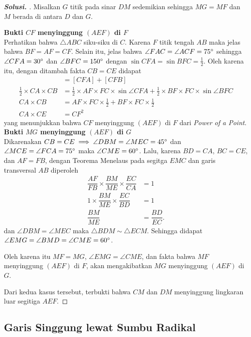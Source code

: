 \documentclass[letterpaper, 13pt]{scrartcl}
\begin{document}
\begin{proof}[\textbf{Solusi. }]
    Misalkan $G$ titik pada sinar $DM$ sedemikian sehingga $MG = MF$ dan $M$ berada di antara $D$ dan $G$.

\textbf{Bukti $CF$ menyinggung $(AEF)$ di $F$}\\
Perhatikan bahwa $\triangle ABC$ siku-siku di $C$. Karena $F$ titik tengah $AB$ maka jelas bahwa $BF=AF=CF$. Selain itu, jelas bahwa $\angle FAC = \angle ACF = 75^\circ$ sehingga $\angle CFA = 30^\circ$ dan $\angle BFC = 150^\circ$ dengan $\sin CFA = \sin BFC = \frac{1}{2}$. Oleh karena itu, dengan ditambah fakta $CB = CE$ didapat
\begin{align*}
    [ABC] &= [CFA] + [CFB]\\
    \frac{1}{2} \times CA \times CB &= \frac{1}{2} \times AF \times FC \times \sin \angle CFA + \frac{1}{2} \times BF \times FC \times \sin \angle BFC\\
     CA \times CB &= AF \times FC \times \frac{1}{2} + BF \times FC \times \frac{1}{2} \\
     CA \times CE &= CF^2
\end{align*}
yang menunjukkan bahwa $CF$ menyinggung $(AEF)$ di $F$ dari \textit{Power of a Point}.\\
\newline
\textbf{Bukti $MG$ menyinggung $(AEF)$ di $G$}\\
Dikarenakan $CB = CE \implies \angle DBM = \angle MEC = 45^\circ$ dan $\angle MCE = \angle FCA = 75^\circ$ maka $\angle CME = 60^\circ$.
Lalu, karena $BD = CA$, $BC = CE$, dan $AF=FB$, dengan Teorema Menelaus pada segitga $EMC$ dan garis transversal $AB$ diperoleh
\begin{align*}
    \dfrac{AF}{FB} \times \dfrac{BM}{ME} \times \dfrac{EC}{CA} &= 1\\
    1 \times \dfrac{BM}{ME} \times \dfrac{EC}{BD} &= 1\\
    \dfrac{BM}{ME} &= \dfrac{BD}{EC}.
\end{align*}
dan $\angle DBM = \angle MEC$ maka $\triangle BDM \sim \triangle ECM$. Sehingga didapat $\angle EMG = \angle BMD = \angle CME = 60^\circ$. 

Oleh karena itu $MF = MG$, $\angle EMG = \angle CME$, dan fakta bahwa $MF$ menyinggung $(AEF)$ di $F$, akan mengakibatkan $MG$ menyinggung $(AEF)$ di $G$.

Dari kedua kasus tersebut, terbukti bahwa $CM$ dan $DM$ menyinggung lingkaran luar segitiga $AEF$.
\end{proof}

\subsection{Garis Singgung lewat Sumbu Radikal}
\end{document}
